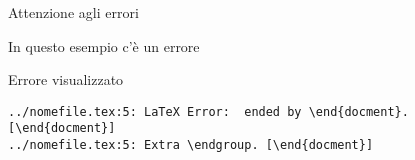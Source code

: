 \begin{frame}[fragile]{Attenzione agli errori}

\begin{esempio}{In questo esempio c'è un errore}
\end{esempio}

\pause

\begin{alertblock}{Errore visualizzato}
	\begin{code}
	\begin{verbatim}
../nomefile.tex:5: LaTeX Error:  ended by \end{docment}. [\end{docment}]
../nomefile.tex:5: Extra \endgroup. [\end{docment}]
	\end{verbatim}
	\end{code}
\end{alertblock}

\end{frame}